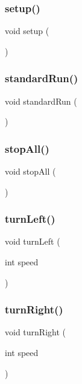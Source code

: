 \mbox{\label{car_8ino_a4fc01d736fe50cf5b977f755b675f11d}} 
\subsubsection{\texorpdfstring{setup()}{setup()}}
{\footnotesize\ttfamily void setup (\begin{DoxyParamCaption}{ }\end{DoxyParamCaption})}

\mbox{\label{car_8ino_af597af78b8192bd4439e8d1d570e95a1}} 
\subsubsection{\texorpdfstring{standard\+Run()}{standardRun()}}
{\footnotesize\ttfamily void standard\+Run (\begin{DoxyParamCaption}{ }\end{DoxyParamCaption})}

\mbox{\label{car_8ino_a4823aa91e33925c0da5969f5011c07da}} 
\subsubsection{\texorpdfstring{stop\+All()}{stopAll()}}
{\footnotesize\ttfamily void stop\+All (\begin{DoxyParamCaption}{ }\end{DoxyParamCaption})}

\mbox{\label{car_8ino_adcc2352cf3d5cf7317b119265c8deb03}} 
\subsubsection{\texorpdfstring{turn\+Left()}{turnLeft()}}
{\footnotesize\ttfamily void turn\+Left (\begin{DoxyParamCaption}\item[{int}]{speed }\end{DoxyParamCaption})}

\mbox{\label{car_8ino_af9cc2a3cfa7536ca9039202968bc40b5}} 
\subsubsection{\texorpdfstring{turn\+Right()}{turnRight()}}
{\footnotesize\ttfamily void turn\+Right (\begin{DoxyParamCaption}\item[{int}]{speed }\end{DoxyParamCaption})}

